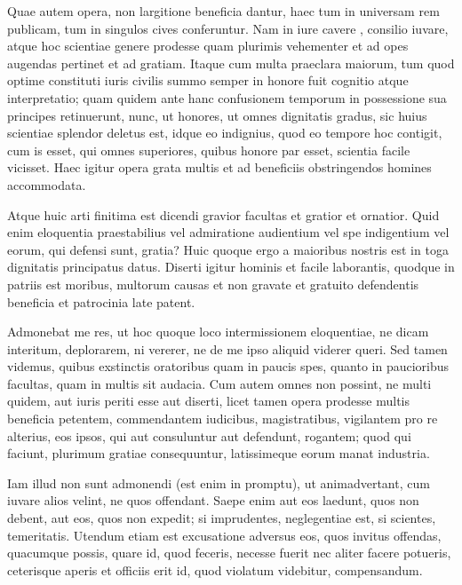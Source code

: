  Quae autem opera, non largitione beneficia dantur, haec tum in universam rem publicam, tum in singulos cives conferuntur. Nam in iure cavere , consilio iuvare, atque hoc scientiae genere prodesse quam plurimis vehementer et ad opes augendas pertinet et ad gratiam. Itaque cum multa praeclara maiorum, tum quod optime constituti iuris civilis summo semper in honore fuit cognitio atque interpretatio; quam quidem ante hanc confusionem temporum in possessione sua principes retinuerunt, nunc, ut honores, ut omnes dignitatis gradus, sic huius scientiae splendor deletus est, idque eo indignius, quod eo tempore hoc contigit, cum is esset, qui omnes superiores, quibus honore par esset, scientia facile vicisset. Haec igitur opera grata multis et ad beneficiis obstringendos homines accommodata.

 Atque huic arti finitima est dicendi gravior facultas et gratior et ornatior. Quid enim eloquentia praestabilius vel admiratione audientium vel spe indigentium vel eorum, qui defensi sunt, gratia? Huic quoque ergo a maioribus nostris est in toga dignitatis principatus datus. Diserti igitur hominis et facile laborantis, quodque in patriis est moribus, multorum causas et non gravate et gratuito defendentis beneficia et patrocinia late patent.

 Admonebat me res, ut hoc quoque loco intermissionem eloquentiae, ne dicam interitum, deplorarem, ni vererer, ne de me ipso aliquid viderer queri. Sed tamen videmus, quibus exstinctis oratoribus quam in paucis spes, quanto in paucioribus facultas, quam in multis sit audacia. Cum autem omnes non possint, ne multi quidem, aut iuris periti esse aut diserti, licet tamen opera prodesse multis beneficia petentem, commendantem iudicibus, magistratibus, vigilantem pro re alterius, eos ipsos, qui aut consuluntur aut defendunt, rogantem; quod qui faciunt, plurimum gratiae consequuntur, latissimeque eorum manat industria.

 Iam illud non sunt admonendi (est enim in promptu), ut animadvertant, cum iuvare alios velint, ne quos offendant. Saepe enim aut eos laedunt, quos non debent, aut eos, quos non expedit; si imprudentes, neglegentiae est, si scientes, temeritatis. Utendum etiam est excusatione adversus eos, quos invitus offendas, quacumque possis, quare id, quod feceris, necesse fuerit nec aliter facere potueris, ceterisque aperis et officiis erit id, quod violatum videbitur, compensandum.

